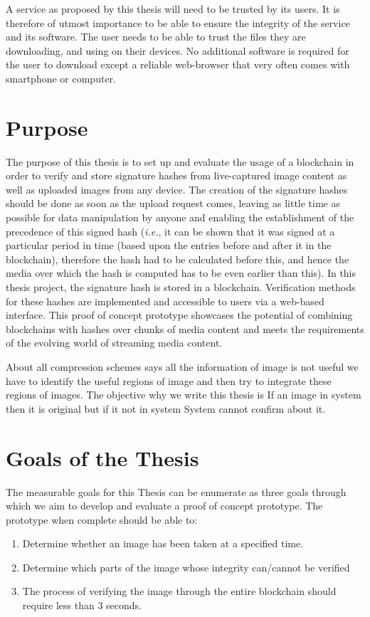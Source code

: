 A service as proposed by this thesis will need to be trusted by its users. It is therefore of utmost importance to be able to ensure the integrity of the service and its software. The user needs to be able to trust the files they are downloading, and using on their devices. No additional software is required for the user to download except a reliable web-browser that very often comes with smartphone or computer.

\section{Purpose}
\label{sec:purpose}
The purpose of this thesis is to set up and evaluate the usage of a blockchain in order to verify and store signature hashes from live-captured image content as well as uploaded images from any device.
The creation of the signature hashes should be done as soon as the upload request comes, leaving as little time as possible for data manipulation by anyone and enabling the establishment of the precedence of this signed hash (\textit{i.e.}, it can be shown that it was signed at a particular period in time (based upon the entries before and after it in the blockchain), therefore the hash had to be calculated before this, and hence the media over which the hash is computed has to be even earlier than this).
In this thesis project, the signature hash is stored in a blockchain. Verification methods for these hashes are implemented
and accessible to users via a web-based interface. This proof of concept prototype showcases the potential of combining blockchains with hashes over chunks of media content and meets the requirements of the evolving world of streaming media content.

About all compression schemes says all the information of image is not useful we have to identify the useful regions of image and then try to integrate these regions of images. The objective why we write this thesis is If an  image in system then it is original but if it not in system System cannot confirm about it.

\section{Goals of the Thesis}
\label{sec:goals}
The measurable goals for this Thesis can be enumerate as three goals through which we aim to develop and evaluate a proof of concept prototype. The prototype when complete should be able to:
\begin{enumerate}
\item Determine whether an image has been taken at a specified time.
\item Determine which parts of the image whose integrity can/cannot be verified
\item The process of verifying the image through the entire blockchain should require less than 3 seconds.
\end{enumerate}

